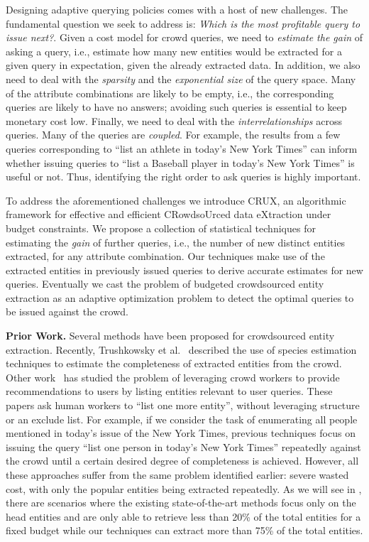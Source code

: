 Designing adaptive querying policies comes with a host of new challenges. The fundamental question we seek to address is: {\em Which is the most profitable query to issue next?}. Given a cost model for crowd queries, we need to {\em estimate the gain} of asking a query, i.e., estimate how many new entities would be extracted for a given query in expectation, given the already extracted data. In addition, we also need to deal with the {\em sparsity} and the {\em exponential size} of the query space. Many of the attribute combinations are likely to be empty, i.e., the corresponding queries are likely to have no answers; avoiding such queries is essential to keep monetary cost low. Finally, we need to deal with the {\em interrelationships} across queries. Many of the queries are {\em coupled}. For example, the results from a few queries corresponding to ``list an athlete in today's New York Times'' can inform whether issuing queries to ``list a Baseball player in today's New York Times'' is useful or not.  Thus, identifying the right order to ask queries is highly important.

To address the aforementioned challenges we introduce CRUX, an algorithmic framework for effective and efficient CRowdsoUrced data eXtraction under budget constraints. We propose a collection of  statistical techniques for estimating the {\em gain} of further queries, i.e., the number of new distinct entities extracted, for any attribute combination. Our techniques make use of the extracted entities in previously issued queries to derive accurate estimates for new queries. Eventually we cast the problem of budgeted crowdsourced entity extraction as an adaptive optimization problem to detect the optimal queries to be issued against the crowd.

\noindent
{\bf Prior Work.} Several methods have been proposed for crowdsourced entity extraction. Recently, Trushkowsky et al.~\cite{trushkowsky:2013}
described the use of species estimation techniques to estimate the completeness of extracted entities from the crowd. 
Other work~\cite{amsterdamer:2014} has studied the problem of leveraging crowd workers to provide recommendations to users by listing entities relevant to user queries. These papers ask human workers to ``list one more entity'', without leveraging structure or an exclude list. For example, if we consider the task of enumerating all people mentioned in today's issue of the New York Times, previous techniques focus on issuing the query ``list one person in today's New York Times'' repeatedly against the crowd until a certain desired degree of completeness is achieved.
However, all these approaches suffer from the same problem identified earlier: severe wasted cost,
with only the popular entities being extracted repeatedly. As we will see in , there are scenarios where the existing state-of-the-art methods focus only on the head entities and are only able to retrieve less than 20\% of the total entities for a fixed budget while our techniques can extract more than 75\% of the total entities.


